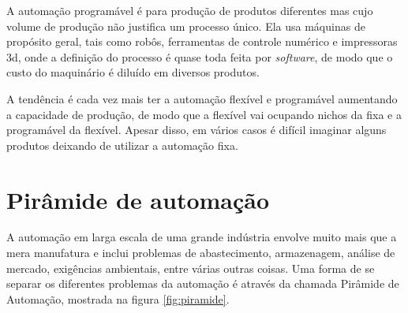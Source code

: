 A automação programável é para produção de produtos diferentes mas cujo volume de produção não justifica um processo único. Ela usa máquinas de propósito geral, tais como robôs, ferramentas de controle numérico e impressoras 3d, onde a definição do processo é quase toda feita por \emph{software}, de modo que o custo do maquinário é diluído em diversos produtos.

A tendência é cada vez mais ter a automação flexível e programável aumentando a capacidade de produção, de modo que a flexível vai ocupando nichos da fixa e a programável da flexível. Apesar disso, em vários casos é difícil imaginar alguns produtos deixando de utilizar a automação fixa.

\section{Pirâmide de automação}

A automação em larga escala de uma grande indústria envolve muito mais que a mera manufatura e inclui problemas de abastecimento, armazenagem, análise de mercado, exigências ambientais, entre várias outras coisas. Uma forma de se separar os diferentes problemas da automação é através da chamada Pirâmide de Automação, mostrada na figura \ref{fig:piramide}.

